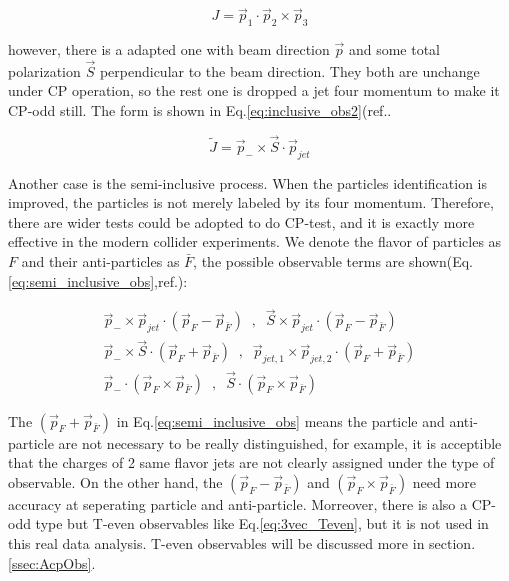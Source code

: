 		\begin{equation}
		J = \vec{p}_1 \cdot \vec{p}_2 \times \vec{p}_3
		\label{eq:inclusive_obs1}
		\end{equation}
		\FloatBarrier

		however, there is a adapted one with beam direction $\vec{p}$ and some total polarization $\vec{S}$ perpendicular to the beam direction. They both are unchange under CP operation, so the rest one is dropped a jet four momentum to make it CP-odd still. The form is shown in Eq.\ref{eq:inclusive_obs2}(ref.\cite{PhysRevLett.58.451}.

		\begin{equation}
		\widetilde{J} = \vec{p}_- \times \vec{S} \cdot \vec{p}_{jet}
		\label{eq:inclusive_obs2}
		\end{equation}
		\FloatBarrier

		Another case is the semi-inclusive process. When the particles identification is improved, the particles is not merely labeled by its four momentum. Therefore, there are wider tests could be adopted to do CP-test, and it is exactly more effective in the modern collider experiments. We denote the flavor of particles as $F$ and their anti-particles as $\bar{F}$, the possible observable terms are shown(Eq.\ref{eq:semi_inclusive_obs},ref.\cite{PhysRevLett.58.451}):

		\begin{equation}
		\begin{split}
		\vec{p}_- \times \vec{p}_{jet} \cdot ( \vec{p}_F - \vec{p}_{\bar{F}} ) \;\;, \;\; \vec{S} \times \vec{p}_{jet} \cdot ( \vec{p}_F - \vec{p}_{\bar{F}} ) \\
		\vec{p}_- \times \vec{S} \cdot ( \vec{p}_F + \vec{p}_{\bar{F}} ) \;\;, \;\; \vec{p}_{jet,1} \times \vec{p}_{jet,2} \cdot ( \vec{p}_F + \vec{p}_{\bar{F}} ) \\
		\vec{p}_- \cdot ( \vec{p}_F \times \vec{p}_{\bar{F}} ) \;\;,\;\; \vec{S} \cdot ( \vec{p}_F \times \vec{p}_{\bar{F}} )
		\label{eq:semi_inclusive_obs}
		\end{split}
		\end{equation}
		\FloatBarrier

		The $(\vec{p}_F + \vec{p}_{\bar{F}})$ in Eq.\ref{eq:semi_inclusive_obs} means the particle and anti-particle are not necessary to be really distinguished, for example, it is acceptible that the charges of 2 same flavor jets are not clearly assigned under the type of observable. On the other hand, the $(\vec{p}_F - \vec{p}_{\bar{F}})$ and $(\vec{p}_F \times \vec{p}_{\bar{F}})$ need more accuracy at seperating particle and anti-particle. Morreover, there is also a CP-odd type but T-even observables like Eq.\ref{eq:3vec_Teven}, but it is not used in this real data analysis. T-even observables will be discussed more in section.\ref{ssec:AcpObs}.

